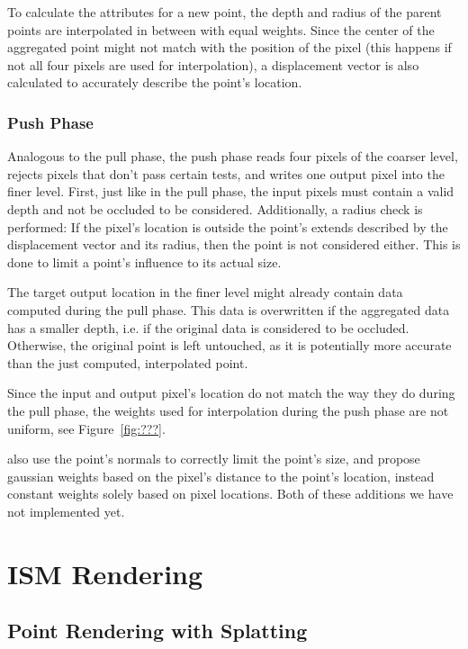 To calculate the attributes for a new point, the depth and radius of the parent points are interpolated in between with equal weights. Since the center of the aggregated point might not match with the position of the pixel (this happens if not all four pixels are used for interpolation), a displacement vector is also calculated to accurately describe the point's location.


\subsubsection{Push Phase}

Analogous to the pull phase, the push phase reads four pixels of the coarser level, rejects pixels that don't pass certain tests, and writes one output pixel into the finer level. First, just like in the pull phase, the input pixels must contain a valid depth and not be occluded to be considered. Additionally, a radius check is performed: If the pixel's location is outside the point's extends described by the displacement vector and its radius, then the point is not considered either. This is done to limit a point's influence to its actual size.

The target output location in the finer level might already contain data computed during the pull phase. This data is overwritten if the aggregated data has a smaller depth, i.e. if the original data is considered to be occluded. Otherwise, the original point is left untouched, as it is potentially more accurate than the just computed, interpolated point.

Since the input and output pixel's location do not match the way they do during the pull phase, the weights used for interpolation during the push phase are not uniform, see Figure~\ref{fig:???}.

 \cite{Marroquim:2007:reconstruction} also use the point's normals to correctly limit the point's size, and \cite{Marroquim:2008:reconstruction2} propose gaussian weights based on the pixel's distance to the point's location, instead constant weights solely based on pixel locations. Both of these additions we have not implemented yet.



 \section{ISM Rendering}

 \subsection{Point Rendering with Splatting}




